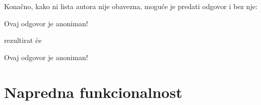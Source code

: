 \documentclass{studosi-workbook}
\begin{document}
	Konačno, kako ni lista autora nije obavezna, moguće je predati odgovor i bez nje:
	
	\begin{kod}
	\begin{odgovor}
		Ovaj odgovor je anoniman!
	\end{odgovor}
	\end{kod}
	
	rezultirat će
	
	\begin{odgovor}
		Ovaj odgovor je anoniman!
	\end{odgovor}

	\vspace*{15pt}


	\section{Napredna funkcionalnost}
	
	
\end{document}
